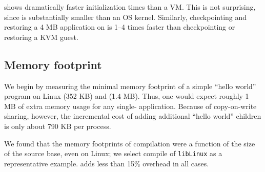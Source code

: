 \graphene{} shows dramatically faster initialization times than a VM. This is not surprising,
since \graphene{} is substantially smaller than an OS kernel. 
Similarly, checkpointing and restoring a 4 MB application on \graphene{} is 1--4 times faster than checkpointing or restoring a KVM guest.




\subsection{Memory footprint}
\label{sec:eval:graphene:memory}

We begin by measuring the minimal memory footprint of a simple ``hello world'' program 
on Linux (352 KB) and \graphene{} (1.4 MB).
Thus, one would expect roughly 1 MB of extra memory usage for any single-\picoproc{} application.
Because of copy-on-write sharing, however, the incremental cost of adding additional ``hello world'' children
is only about 790 KB per process.

%


We found that the memory footprints of compilation were a function of the 
size of the source base, even on Linux; we select compile of {\tt libLinux} as a representative example.
\graphene{} adds less than 15\% overhead in all cases.

